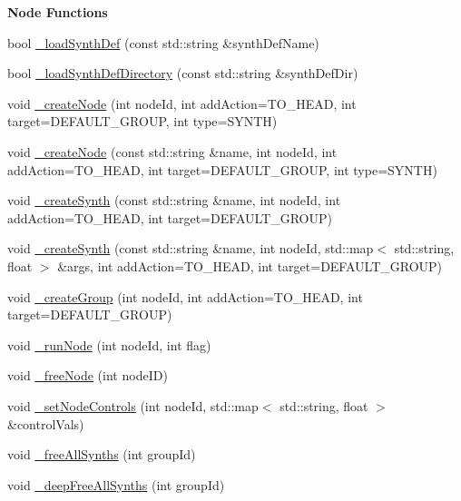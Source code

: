 \begin{Indent}{\bf Node Functions}\par
\begin{DoxyCompactItemize}
\item 
bool \hyperlink{classColliderPlusPlus_1_1Client__Server_ad95270fb115d2fbad727f32130388adf}{\-\_\-load\-Synth\-Def} (const std\-::string \&synth\-Def\-Name)
\item 
bool \hyperlink{classColliderPlusPlus_1_1Client__Server_aba8d4f99041d1b47e1571039c8df7327}{\-\_\-load\-Synth\-Def\-Directory} (const std\-::string \&synth\-Def\-Dir)
\item 
void \hyperlink{classColliderPlusPlus_1_1Client__Server_a8112bffd21ce3d850fc8e1003d58f6d9}{\-\_\-create\-Node} (int node\-Id, int add\-Action=T\-O\-\_\-\-H\-E\-A\-D, int target=D\-E\-F\-A\-U\-L\-T\-\_\-\-G\-R\-O\-U\-P, int type=S\-Y\-N\-T\-H)
\item 
void \hyperlink{classColliderPlusPlus_1_1Client__Server_a6924420f2e0adcfbccdd41c8e8d84ef2}{\-\_\-create\-Node} (const std\-::string \&name, int node\-Id, int add\-Action=T\-O\-\_\-\-H\-E\-A\-D, int target=D\-E\-F\-A\-U\-L\-T\-\_\-\-G\-R\-O\-U\-P, int type=S\-Y\-N\-T\-H)
\item 
void \hyperlink{classColliderPlusPlus_1_1Client__Server_a0ad9d70cad6f9efdc28661c786740c18}{\-\_\-create\-Synth} (const std\-::string \&name, int node\-Id, int add\-Action=T\-O\-\_\-\-H\-E\-A\-D, int target=D\-E\-F\-A\-U\-L\-T\-\_\-\-G\-R\-O\-U\-P)
\item 
void \hyperlink{classColliderPlusPlus_1_1Client__Server_a40d2e779b8abe2ca1f4ef2a36b9d9ad1}{\-\_\-create\-Synth} (const std\-::string \&name, int node\-Id, std\-::map$<$ std\-::string, float $>$ \&args, int add\-Action=T\-O\-\_\-\-H\-E\-A\-D, int target=D\-E\-F\-A\-U\-L\-T\-\_\-\-G\-R\-O\-U\-P)
\item 
void \hyperlink{classColliderPlusPlus_1_1Client__Server_a488b74748594b325e52f5e003c9ca7b8}{\-\_\-create\-Group} (int node\-Id, int add\-Action=T\-O\-\_\-\-H\-E\-A\-D, int target=D\-E\-F\-A\-U\-L\-T\-\_\-\-G\-R\-O\-U\-P)
\item 
void \hyperlink{classColliderPlusPlus_1_1Client__Server_a6a7d155ca004a6a26409517a3f762aee}{\-\_\-run\-Node} (int node\-Id, int flag)
\item 
void \hyperlink{classColliderPlusPlus_1_1Client__Server_ad8d8e91efa40eb11edfdca802a82ec9a}{\-\_\-free\-Node} (int node\-I\-D)
\item 
void \hyperlink{classColliderPlusPlus_1_1Client__Server_a54cbee6b8ac056f77d0df2e77d79d260}{\-\_\-set\-Node\-Controls} (int node\-Id, std\-::map$<$ std\-::string, float $>$ \&control\-Vals)
\item 
void \hyperlink{classColliderPlusPlus_1_1Client__Server_a05ffd0269ebcebeabe211a5406782544}{\-\_\-free\-All\-Synths} (int group\-Id)
\item 
void \hyperlink{classColliderPlusPlus_1_1Client__Server_a12c0bde46f4660bf12a22e2262183c53}{\-\_\-deep\-Free\-All\-Synths} (int group\-Id)
\end{DoxyCompactItemize}
\end{Indent}
